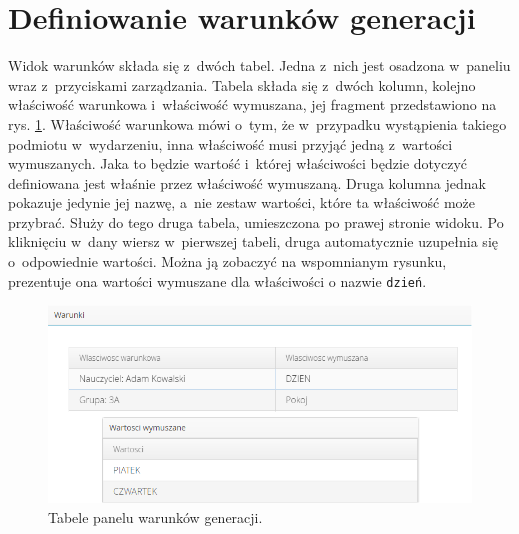 \documentclass[a4paper]{book}
\begin{document}
{\section{Definiowanie warunków generacji}
Widok warunków składa się z~dwóch tabel. Jedna z~nich jest osadzona w~paneliu wraz z~przyciskami zarządzania. Tabela składa się z~dwóch kolumn, kolejno właściwość warunkowa i~właściwość wymuszana, jej fragment przedstawiono na rys. \ref{id:fig:warunki1}. Właściwość warunkowa mówi o~tym, że w~przypadku wystąpienia takiego podmiotu w~wydarzeniu, inna właściwość musi przyjąć jedną z~wartości wymuszanych. Jaka to będzie wartość i~której właściwości będzie dotyczyć definiowana jest właśnie przez właściwość wymuszaną. Druga kolumna jednak pokazuje jedynie jej nazwę, a~nie zestaw wartości, które ta właściwość może przybrać. Służy do tego druga tabela, umieszczona po prawej stronie widoku. Po kliknięciu w~dany wiersz w~pierwszej tabeli, druga automatycznie uzupełnia się o~odpowiednie wartości. Można ją zobaczyć na wspomnianym rysunku, prezentuje ona wartości wymuszane dla właściwości o nazwie \lstinline|dzień|.
\begin{figure}
	\centering
	\includegraphics[width=1.0\textwidth]{./img/warunki1.png}
	\caption{Tabele panelu warunków generacji.}
	\label{id:fig:warunki1}
\end{figure}

}
\end{document}
